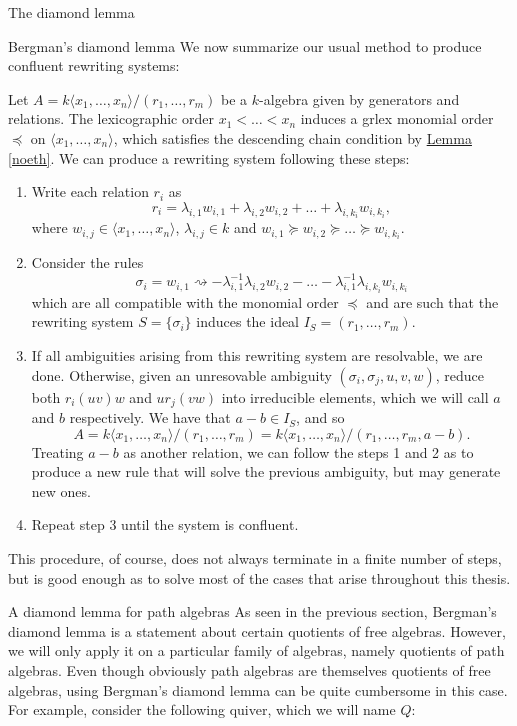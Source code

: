 \begin{chapter}{The diamond lemma}
\begin{section}{Bergman's diamond lemma}
We now summarize our usual method to produce confluent rewriting systems:

\begin{heur}\label{heuristic} Let $A=k\langle x_1,\dots,x_n\rangle/(r_1,\dots,r_m)$ be a $k$-algebra given by generators and relations. The lexicographic order $x_1<\dots<x_n$ induces a grlex monomial order $\preceq$ on $\langle x_1,\dots,x_n\rangle$, which satisfies the descending chain condition by \hyperref[noeth]{Lemma \ref*{noeth}}. We can produce a rewriting system following these steps:
\begin{enumerate}
\item Write each relation $r_i$ as
\[r_i = \lambda_{i,1}w_{i,1} + \lambda_{i,2} w_{i,2} + \dots + \lambda_{i,k_i} w_{i, k_i},\]
where $w_{i,j}\in \langle x_1,\dots,x_n\rangle$, $\lambda_{i,j}\in k$ and $w_{i,1}\succeq w_{i,2}\succeq\dots\succeq w_{i,k_i}$.
\item Consider the rules
\[\sigma_i = w_{i,1} \rightsquigarrow -\lambda_{i,1}^{-1}\lambda_{i,2}w_{i,2}-\dots-\lambda_{i,1}^{-1}\lambda_{i,k_i}w_{i,k_i}\]
which are all compatible with the monomial order $\preceq$ and are such that the rewriting system $S=\{\sigma_i\}$ induces the ideal $I_S=(r_1,\dots,r_m)$.
\item If all ambiguities arising from this rewriting system are resolvable, we are done. Otherwise, given an unresovable ambiguity $(\sigma_i, \sigma_j, u,v,w)$, reduce both $r_i(uv)w$ and $ur_j(vw)$ into irreducible elements, which we will call $a$ and $b$ respectively. We have that $a-b\in I_S$, and so \[A=k\langle x_1,\dots,x_n\rangle/(r_1,\dots,r_m)=k\langle x_1,\dots,x_n\rangle/(r_1,\dots,r_m, a-b).\]
Treating $a-b$ as another relation, we can follow the steps 1 and 2 as to produce a new rule that will solve the previous ambiguity, but may generate new ones.
\item Repeat step 3 until the system is confluent.
\end{enumerate}
This procedure, of course, does not always terminate in a finite number of steps, but is good enough as to solve most of the cases that arise throughout this thesis.
\end{heur}
\end{section}
\begin{section}{A diamond lemma for path algebras}
\label{path-diamond}
As seen in the previous section, Bergman's diamond lemma is a statement about certain quotients of free algebras. However, we will only apply it on a particular family of algebras, namely quotients of path algebras. Even though obviously path algebras are themselves quotients of free algebras, using Bergman's diamond lemma can be quite cumbersome in this case. For example, consider the following quiver, which we will name $Q$:

\end{section}
\end{chapter}
